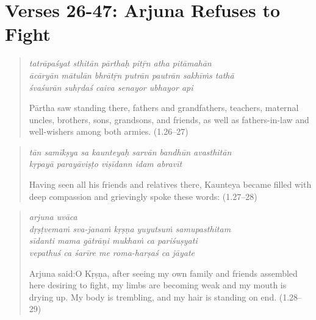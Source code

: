 \documentclass[12pt, twoside, openright]{memoir}
\begin{document}
\section{Verses 26-47: Arjuna Refuses to Fight}\label{sec-verses-26-47-arjuna-refuses-to-fight}

\par
\begin{verse}
\textit{tatrāpaśyat sthitān pārthaḥ pitṝn atha pitāmahān} \\
\textit{ācāryān mātulān bhrātṝn putrān pautrān sakhīṁs tathā} \\
\textit{śvaśurān suhṛdaś caiva senayor ubhayor api}

\noindent Pārtha saw standing there, fathers and grandfathers, teachers, maternal uncles, brothers, sons, grandsons, and friends, as well as fathers-in-law and well-wishers among both armies. (1.26–27)
\end{verse}
\par



\par
\begin{verse}
\textit{tān samīkṣya sa kaunteyaḥ sarvān bandhūn avasthitān} \\
\textit{kṛpayā parayāviṣṭo viṣīdann idam abravīt}

\noindent Having seen all his friends and relatives there, Kaunteya became filled with deep compassion and grievingly spoke these words: (1.27–28)
\end{verse}
\par



\par
\begin{verse}
\textit{arjuna uvāca} \\
\textit{dṛṣṭvemaṁ sva-janaṁ kṛṣṇa yuyutsuṁ samupasthitam} \\
\textit{sīdanti mama gātrāṇi mukhaṁ ca pariśuṣyati} \\
\textit{vepathuś ca śarīre me roma-harṣaś ca jāyate}

\noindent \quad Arjuna said:\linebreak O Kṛṣṇa, after seeing my own family and friends assembled here desiring to fight, my limbs are becoming weak and my mouth is drying up. My body is trembling, and my hair is standing on end. (1.28–29)
\end{verse}
\par
\end{document}
